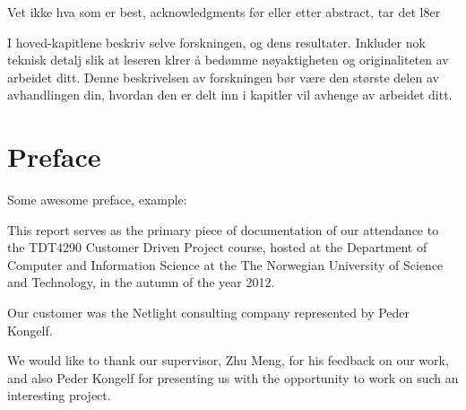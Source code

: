 \documentclass[10pt,a4paper,oneside]{report}
\begin{document}
Vet ikke hva som er best, acknowledgments før eller etter abstract, tar det l8er

I hoved-kapitlene beskriv selve forskningen,
og dens resultater. Inkluder nok teknisk
detalj slik at leseren klrer å bedømme
nøyaktigheten og originaliteten av arbeidet
ditt.
Denne beskrivelsen av forskningen bør være
den største delen av avhandlingen din,
hvordan den er delt inn i kapitler vil avhenge
av arbeidet ditt.


\chapter*{Preface}
Some awesome preface, example:

This report serves as the primary piece of documentation of our attendance to the TDT4290 Customer Driven Project course, hosted at the Department of Computer and Information Science at the The Norwegian University of Science and Technology, in the autumn of the year 2012.

Our customer was the Netlight consulting company represented by Peder Kongelf.

We would like to thank our supervisor, Zhu Meng, for his feedback on our work, and also Peder Kongelf for presenting us with the opportunity to work on such an interesting project.

\setcounter{tocdepth}{2}
\dominitoc
\dominilof
\dominilot
\tableofcontents
\clearpage
\listoffigures
\listoftables













\end{document}

